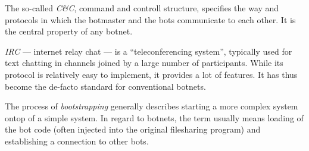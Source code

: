\documentclass{llncs}
\begin{document}
The so-called {\it C\&C}, command and controll structure, specifies
the way and protocols in which the botmaster and the bots communicate
to each other. It is the central property of any botnet.

{\it IRC} --- internet relay chat --- is a ``teleconferencing
system''\cite{irc}, typically used for text chatting in channels
joined by a large number of participants. While its protocol is
relatively easy to implement, it provides a lot of features. It has
thus become the de-facto standard for conventional botnets.

The process of {\it bootstrapping} generally describes starting a more
complex system ontop of a simple system. In regard to botnets, the
term usually means loading of the bot code (often injected into the
original filesharing program) and establishing a connection to other
bots.\cite{wang2009systematic}





\end{document}
